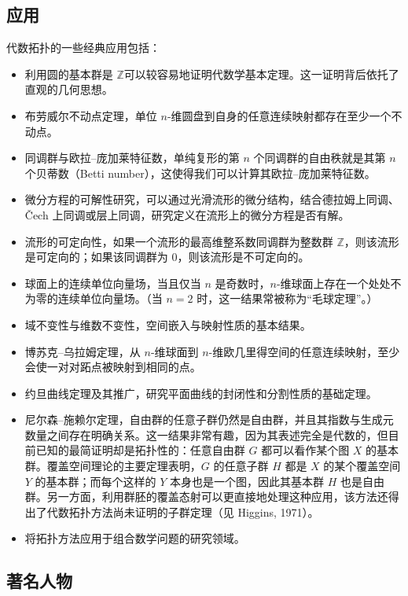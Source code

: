 \subsection{应用}
代数拓扑的一些经典应用包括：
\begin{itemize}
\item 利用圆的基本群是 $\mathbb{Z}$可以较容易地证明代数学基本定理。这一证明背后依托了直观的几何思想。
\item 布劳威尔不动点定理，单位 $n$-维圆盘到自身的任意连续映射都存在至少一个不动点。
\item 同调群与欧拉–庞加莱特征数，单纯复形的第 $n$ 个同调群的自由秩就是其第 $n$ 个贝蒂数（Betti number），这使得我们可以计算其欧拉–庞加莱特征数。
\item 微分方程的可解性研究，可以通过光滑流形的微分结构，结合德拉姆上同调、Čech 上同调或层上同调，研究定义在流形上的微分方程是否有解。
\item 流形的可定向性，如果一个流形的最高维整系数同调群为整数群 $\mathbb{Z}$，则该流形是可定向的；如果该同调群为 $0$，则该流形是不可定向的。
\item 球面上的连续单位向量场，当且仅当 $n$ 是奇数时，$n$-维球面上存在一个处处不为零的连续单位向量场。（当 $n=2$ 时，这一结果常被称为“毛球定理”。）
\item 域不变性与维数不变性，空间嵌入与映射性质的基本结果。
\item 博苏克–乌拉姆定理，从 $n$-维球面到 $n$-维欧几里得空间的任意连续映射，至少会使一对对跖点被映射到相同的点。
\item 约旦曲线定理及其推广，研究平面曲线的封闭性和分割性质的基础定理。
\item 尼尔森–施赖尔定理，自由群的任意子群仍然是自由群，并且其指数与生成元数量之间存在明确关系。这一结果非常有趣，因为其表述完全是代数的，但目前已知的最简证明却是拓扑性的：任意自由群 $G$ 都可以看作某个图 $X$ 的基本群。覆盖空间理论的主要定理表明，$G$ 的任意子群 $H$ 都是 $X$ 的某个覆盖空间 $Y$ 的基本群；而每个这样的 $Y$ 本身也是一个图，因此其基本群 $H$ 也是自由群。另一方面，利用群胚的覆盖态射可以更直接地处理这种应用，该方法还得出了代数拓扑方法尚未证明的子群定理（见 Higgins, 1971）。
\item 将拓扑方法应用于组合数学问题的研究领域。
\end{itemize}
\subsection{著名人物}

